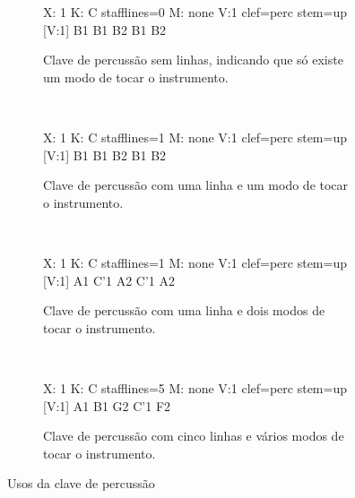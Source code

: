 \begin{figure}[h]
    \centering 
\begin{subfigure}[c]{0.45\textwidth}
\begin{abc}[name=abc-clavepercusion1]
%
X: 1 %
K: C stafflines=0 %
M: none %
V:1 clef=perc stem=up %
%
[V:1] B1 B1 B2 B1 B2   
\end{abc}
\caption{Clave de percussão sem linhas, indicando que só existe um modo de tocar o instrumento.}
\label{fig:abc-claveperczero}
\end{subfigure}
~~%
\begin{subfigure}[c]{0.45\textwidth}
\begin{abc}[name=abc-clavepercusion2a]
%
X: 1 %
K: C stafflines=1 %
M: none %
V:1 clef=perc stem=up %
%
[V:1] B1 B1 B2 B1 B2   
\end{abc}
\caption{Clave de percussão com uma linha e um modo de tocar o instrumento.}
\label{fig:abc-clavepercuma}
\end{subfigure}
~%
\begin{subfigure}[c]{0.45\textwidth}
\begin{abc}[name=abc-clavepercusion2]
%
X: 1 %
K: C stafflines=1 %
M: none %
V:1 clef=perc stem=up %
%
[V:1] A1 C'1 A2 C'1 A2   
\end{abc}
\caption{Clave de percussão com uma linha e dois modos de tocar o instrumento.}
\label{fig:abc-clavepercum2}
\end{subfigure}
~~%
\begin{subfigure}[c]{0.45\textwidth}
\begin{abc}[name=abc-clavepercusion3]
%
X: 1 %
K: C stafflines=5 %
M: none %
V:1 clef=perc stem=up %
%
[V:1] A1 B1 G2 C'1 F2   
\end{abc}
\caption{Clave de percussão com cinco linhas e vários modos de tocar o instrumento.}
\label{fig:abc-claveperccinco}
\end{subfigure}
    \caption{Usos da clave de percussão}\label{fig:allpercusionclaves}
\end{figure}


